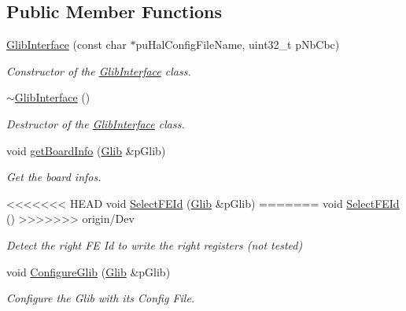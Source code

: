 \subsection*{Public Member Functions}
\begin{DoxyCompactItemize}
\item 
\hyperlink{class_ph2___hw_interface_1_1_glib_interface_aeb62537ce011e67f895bde9981e3cba5}{Glib\-Interface} (const char $\ast$pu\-Hal\-Config\-File\-Name, uint32\-\_\-t p\-Nb\-Cbc)
\begin{DoxyCompactList}\small\item\em Constructor of the \hyperlink{class_ph2___hw_interface_1_1_glib_interface}{Glib\-Interface} class. \end{DoxyCompactList}\item 
\hyperlink{class_ph2___hw_interface_1_1_glib_interface_a1182c81cb29bca33b23a2c9f662df2ed}{$\sim$\-Glib\-Interface} ()
\begin{DoxyCompactList}\small\item\em Destructor of the \hyperlink{class_ph2___hw_interface_1_1_glib_interface}{Glib\-Interface} class. \end{DoxyCompactList}\item 
void \hyperlink{class_ph2___hw_interface_1_1_glib_interface_a51dd2e5a8128fd01a41c4d6b204df948}{get\-Board\-Info} (\hyperlink{class_ph2___hw_description_1_1_glib}{Glib} \&p\-Glib)
\begin{DoxyCompactList}\small\item\em Get the board infos. \end{DoxyCompactList}\item 
<<<<<<< HEAD
void \hyperlink{class_ph2___hw_interface_1_1_glib_interface_ad53d40d7cfea163bd3dcd04e233a02e3}{Select\-F\-E\-Id} (\hyperlink{class_ph2___hw_description_1_1_glib}{Glib} \&p\-Glib)
=======
void \hyperlink{class_ph2___hw_interface_1_1_glib_interface_a73d61c4a430d7a883948184400dfd8b4}{Select\-F\-E\-Id} ()
>>>>>>> origin/Dev
\begin{DoxyCompactList}\small\item\em Detect the right F\-E Id to write the right registers (not tested) \end{DoxyCompactList}\item 
void \hyperlink{class_ph2___hw_interface_1_1_glib_interface_aad68569190ea9b318b5be1abae4fd23f}{Configure\-Glib} (\hyperlink{class_ph2___hw_description_1_1_glib}{Glib} \&p\-Glib)
\begin{DoxyCompactList}\small\item\em Configure the Glib with its Config File. \end{DoxyCompactList}\item 

\end{DoxyCompactItemize}
